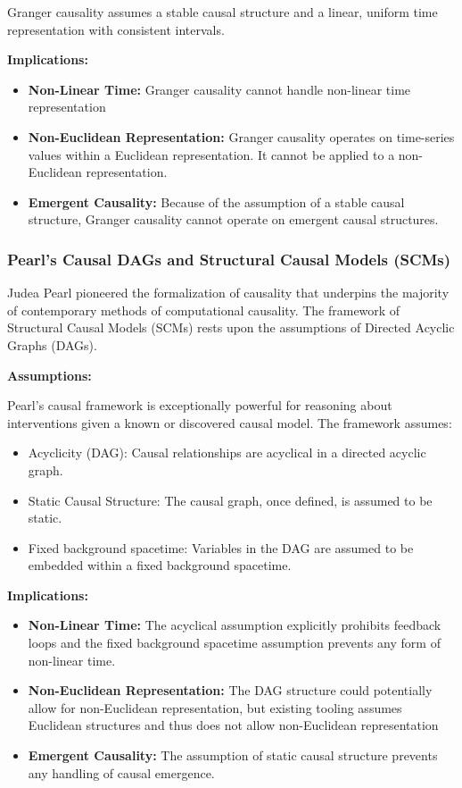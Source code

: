\documentclass{article}
\begin{document}
Granger causality assumes a stable causal structure and a linear, uniform time representation with consistent intervals.

\textbf{Implications:}

\begin{itemize}
    \item \textbf{Non-Linear Time:} Granger causality cannot handle non-linear time representation
    \item \textbf{Non-Euclidean Representation:} Granger causality operates on time-series values within a Euclidean representation. It cannot be applied to a non-Euclidean representation.
    \item \textbf{Emergent Causality:} Because of the assumption of a stable causal structure, Granger causality cannot operate on emergent causal structures.
\end{itemize}


\subsubsection{Pearl's Causal DAGs and Structural Causal Models (SCMs)}

Judea Pearl pioneered the formalization of causality that underpins the majority of contemporary methods of computational causality. The framework of Structural Causal Models\cite{pearl2000causality} (SCMs) rests upon the assumptions of Directed Acyclic Graphs (DAGs).

\textbf{Assumptions:}

Pearl's causal framework is exceptionally powerful for reasoning about interventions given a known or discovered causal model.
The framework assumes: 

\begin{itemize}
    \item Acyclicity (DAG): Causal relationships are acyclical in a directed acyclic graph.
    \item Static Causal Structure: The causal graph, once defined, is assumed to be static.
    \item Fixed background spacetime: Variables in the DAG are assumed to be embedded within a fixed background spacetime.
\end{itemize}


\textbf{Implications:}

\begin{itemize}
    \item \textbf{Non-Linear Time:} The acyclical assumption explicitly prohibits feedback loops and the fixed background spacetime assumption prevents any form of non-linear time.
    \item \textbf{Non-Euclidean Representation:} The DAG structure could potentially allow for non-Euclidean representation, but existing tooling assumes Euclidean structures and thus does not allow non-Euclidean representation
    \item \textbf{Emergent Causality:} The assumption of static causal structure prevents any handling of causal emergence.
\end{itemize}
\end{document}
